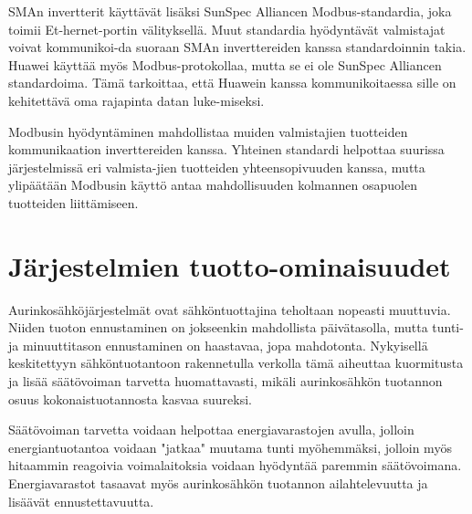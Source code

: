   SMAn invertterit käyttävät lisäksi SunSpec Alliancen Modbus-standardia, joka toimii Et-hernet-portin välityksellä. Muut standardia hyödyntävät valmistajat voivat kommunikoi-da suoraan SMAn inverttereiden kanssa standardoinnin takia. Huawei käyttää myös Modbus-protokollaa, mutta se ei ole SunSpec Alliancen standardoima. Tämä tarkoittaa, että Huawein kanssa kommunikoitaessa sille on kehitettävä oma rajapinta datan luke-miseksi.

  Modbusin hyödyntäminen mahdollistaa muiden valmistajien tuotteiden kommunikaation inverttereiden kanssa. Yhteinen standardi helpottaa suurissa järjestelmissä eri valmista-jien tuotteiden yhteensopivuuden kanssa, mutta ylipäätään Modbusin käyttö antaa mahdollisuuden kolmannen osapuolen tuotteiden liittämiseen.

\section{Järjestelmien tuotto-ominaisuudet}
  Aurinkosähköjärjestelmät ovat sähköntuottajina teholtaan nopeasti muuttuvia. Niiden tuoton ennustaminen on jokseenkin mahdollista päivätasolla, mutta tunti- ja minuuttitason ennustaminen on haastavaa, jopa mahdotonta. Nykyisellä keskitettyyn sähköntuotantoon rakennetulla verkolla tämä aiheuttaa kuormitusta ja lisää säätövoiman tarvetta huomattavasti, mikäli aurinkosähkön tuotannon osuus kokonaistuotannosta kasvaa suureksi. 
  
  Säätövoiman tarvetta voidaan helpottaa energiavarastojen avulla, jolloin energiantuotantoa voidaan "jatkaa" muutama tunti myöhemmäksi, jolloin myös hitaammin reagoivia voimalaitoksia voidaan hyödyntää paremmin säätövoimana. Energiavarastot tasaavat myös aurinkosähkön tuotannon ailahtelevuutta ja lisäävät ennustettavuutta. 
